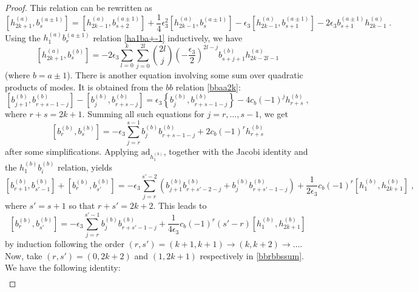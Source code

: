 \documentclass[11pt]{article}
\numberwithin{equation}{section}
\numberwithin{figure}{section}
\numberwithin{table}{section}
\begin{document}
\begin{proof}
This relation can be rewritten as
\begin{equation}
	\left[h^{(a)}_{2k+1},b^{(a\pm1)}_s\right]=\left[h^{(a)}_{2k-1},b^{(a\pm1)}_{s+2}\right]+\frac{1}{4}\epsilon_3^2\left[h^{(a)}_{2k-1},b^{(a\pm1)}_s\right]-\epsilon_3\left[h^{(a)}_{2k-1},b^{(a\pm1)}_{s+1}\right]-2\epsilon_3b^{(a\pm1)}_{s+1}h^{(a)}_{2k-1}\;.
\end{equation}
Using  the $h^{(a)}_1b^{(a\pm1)}_r$ relation \eqref{ha1ba+-1} inductively, we have
\begin{equation}
	\left[h^{(a)}_{2k+1},b^{(b)}_s\right]=-2\epsilon_3\sum_{l=0}^k\sum_{j=0}^{2l}\binom{2l}{j}\left(-\frac{\epsilon_3}{2}\right)^{2l-j}b^{(b)}_{s+j+1}h^{(a)}_{2k-2l-1}\label{habbsum}
\end{equation}
(where $b=a\pm1$). There is another equation involving some sum over quadratic products of modes. It is obtained from the $bb$ relation \eqref{bbaa2k}:
\begin{equation}
	\left[b^{(b)}_{j+1},b^{(b)}_{r+s-1-j}\right]-\left[b^{(b)}_j,b^{(b)}_{r+s-j}\right]=\epsilon_3\left\{b^{(b)}_j,b^{(b)}_{r+s-1-j}\right\}-4c_b(-1)^jh^{(b)}_{r+s}\;,
\end{equation}
where $r+s=2k+1$. Summing all such equations for $j=r,\dots,s-1$, we get
\begin{equation}
	\left[b^{(b)}_r,b^{(b)}_s\right]=-\epsilon_3\sum_{j=r}^{s-1}b^{(b)}_jb^{(b)}_{r+s-1-j}+2c_b(-1)^rh^{(b)}_{r+s}
\end{equation}
after some simplifications. Applying $\mathrm{ad}_{h^{(b)}_1}$, together with the Jacobi identity and the $h^{(b)}_1b^{(b)}_i$ relation, yields
\begin{equation}
	\left[b^{(b)}_{r+1},b^{(b)}_{s'-1}\right]+\left[b^{(b)}_r,b^{(b)}_{s'}\right]=-\epsilon_3\sum_{j=r}^{s'-2}\left(b^{(b)}_{j+1}b^{(b)}_{r+s'-2-j}+b^{(b)}_jb^{(b)}_{r+s'-1-j}\right)+\frac{1}{2\epsilon_3}c_b(-1)^r\left[h^{(b)}_1,h^{(b)}_{2k+1}\right]\;,
\end{equation}
where $s'=s+1$ so that $r+s'=2k+2$. This leads to
\begin{equation}
	\left[b^{(b)}_r,b^{(b)}_{s'}\right]=-\epsilon_3\sum_{j=r}^{s'-1}b^{(b)}_jb^{(b)}_{r+s'-1-j}+\frac{1}{4\epsilon_3}c_b(-1)^r(s'-r)\left[h^{(b)}_1,h^{(b)}_{2k+1}\right]\label{bbrbbssum}
\end{equation}
by induction following the order $(r,s')=(k+1,k+1)\rightarrow(k,k+2)\rightarrow\dots$. Now, take $(r,s')=(0,2k+2)$ and $(1,2k+1)$ respectively in \eqref{bbrbbssum}. We have the following identity:
\begin{align}

\end{align}
\end{proof}
\end{document}
